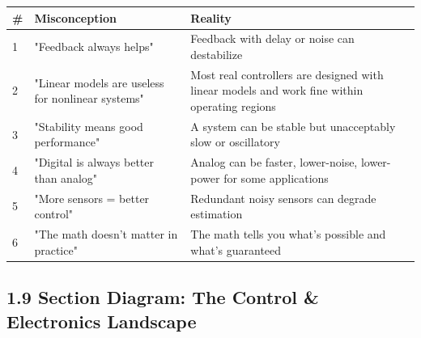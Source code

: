 \documentclass[11pt,a4paper]{book}
\begin{document}
\begin{center}
\begin{tabular}{|l|l|l|}
\hline
# & Misconception & Reality \\
\hline
1 & "Feedback always helps" & Feedback with delay or noise can destabilize \\
2 & "Linear models are useless for nonlinear systems" & Most real controllers are designed with linear models and work fine within operating regions \\
3 & "Stability means good performance" & A system can be stable but unacceptably slow or oscillatory \\
4 & "Digital is always better than analog" & Analog can be faster, lower-noise, lower-power for some applications \\
5 & "More sensors = better control" & Redundant noisy sensors can degrade estimation \\
6 & "The math doesn't matter in practice" & The math tells you what's possible and what's guaranteed \\
\hline
\end{tabular}
\end{center}

\medskip\noindent\hrulefill\medskip

\subsection{1.9 Section Diagram: The Control & Electronics Landscape}

\end{document}
